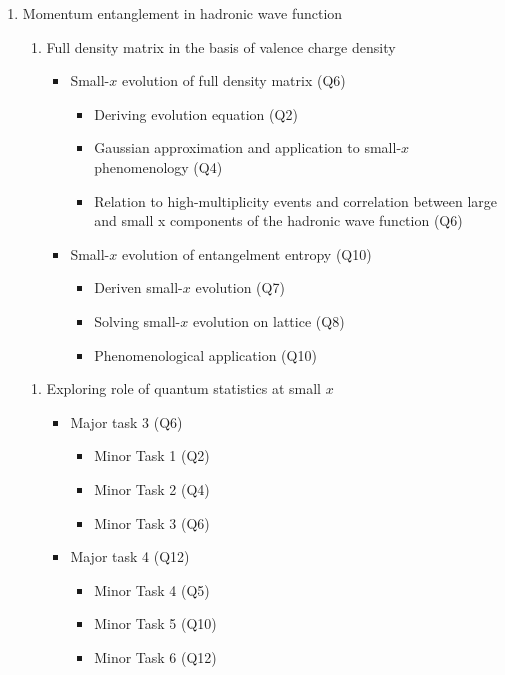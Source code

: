 \begin{enumerate}
    \item Momentum entanglement in hadronic wave function
        \begin{enumerate}
            \item Full density matrix  in the basis 
				of valence charge density
                \begin{itemize}
                    \item Small-$x$ evolution of full density matrix (Q6)
                        \begin{itemize}
                            \item Deriving evolution equation (Q2)
                            \item Gaussian approximation and application to small-$x$ 
								phenomenology (Q4)
                            \item Relation to high-multiplicity events and correlation between large and small x components of the hadronic  wave function (Q6)
                        \end{itemize}
                    \item  Small-$x$ evolution of entangelment entropy   (Q10)
                        \begin{itemize}
                            \item Deriven small-$x$ evolution (Q7)
                            \item Solving small-$x$ evolution on lattice (Q8)
                            \item Phenomenological application  (Q10)
                        \end{itemize}
                \end{itemize}
        \end{enumerate}
        \begin{enumerate}
            \item Exploring role of quantum statistics at small $x$
                \begin{itemize}
                    \item Major task 3 (Q6)
                        \begin{itemize}
                            \item Minor Task 1 (Q2)
                            \item Minor Task 2 (Q4)
                            \item Minor Task 3 (Q6)
                        \end{itemize}
                    \item Major task 4 (Q12)
                        \begin{itemize}
                            \item Minor Task 4 (Q5)
                            \item Minor Task 5 (Q10)
                            \item Minor Task 6 (Q12)
                        \end{itemize}
                \end{itemize}
        \end{enumerate}

\end{enumerate}

